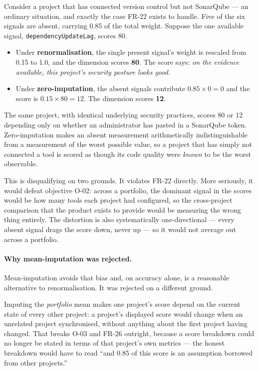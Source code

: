 Consider a project that has connected version control but not SonarQube --- an
ordinary situation, and exactly the case FR-22 exists to handle. Five of the six
signals are absent, carrying 0.85 of the total weight. Suppose the one available
signal, \texttt{dependencyUpdateLag}, scores 80.

\begin{itemize}
  \item Under \textbf{renormalisation}, the single present signal's weight is
  rescaled from 0.15 to 1.0, and the dimension scores \textbf{80}. The score
  says: \emph{on the evidence available, this project's security posture looks
  good.}
  \item Under \textbf{zero-imputation}, the absent signals contribute
  $0.85 \times 0 = 0$ and the score is $0.15 \times 80 = 12$. The dimension
  scores \textbf{12}.
\end{itemize}

The same project, with identical underlying security practices, scores 80 or 12
depending only on whether an administrator has pasted in a SonarQube token.
Zero-imputation makes an absent measurement arithmetically indistinguishable
from a measurement of the worst possible value, so a project that has simply not
connected a tool is scored as though its code quality were \emph{known} to be
the worst observable.

This is disqualifying on two grounds. It violates FR-22 directly. More
seriously, it would defeat objective O-02: across a portfolio, the dominant
signal in the scores would be how many tools each project had configured, so the
cross-project comparison that the product exists to provide would be measuring
the wrong thing entirely. The distortion is also systematically
one-directional --- every absent signal drags the score down, never up --- so it
would not average out across a portfolio.

\paragraph{Why mean-imputation was rejected.} Mean-imputation avoids that bias
and, on accuracy alone, is a reasonable alternative to renormalisation. It was
rejected on a different ground.

Imputing the \emph{portfolio} mean makes one project's score depend on the
current state of every other project: a project's displayed score would change
when an unrelated project synchronised, without anything about the first project
having changed. That breaks O-03 and FR-26 outright, because a score breakdown
could no longer be stated in terms of that project's own metrics --- the honest
breakdown would have to read ``and 0.85 of this score is an assumption borrowed
from other projects.''

